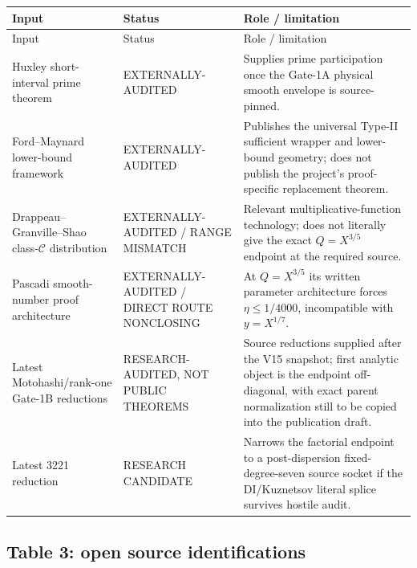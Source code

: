 \documentclass[11pt]{article}
\theoremstyle{definition}
\newcommand{\1}{\mathbf 1}
\newcommand{\status}[1]{\textsf{#1}}
\begin{document}
{\begin{longtable}{p{}p{}p{}}
\toprule
Input & Status & Role / limitation\\
\midrule
\endfirsthead
\toprule
Input & Status & Role / limitation\\
\midrule
Huxley short-interval prime theorem &
\status{EXTERNALLY-AUDITED} &
Supplies prime participation once the Gate-1A physical smooth envelope is source-pinned.\\
Ford--Maynard lower-bound framework &
\status{EXTERNALLY-AUDITED} &
Publishes the universal Type-II sufficient wrapper and lower-bound geometry; does not
publish the project's proof-specific replacement theorem.\\
Drappeau--Granville--Shao class-$\mathcal C$ distribution &
\status{EXTERNALLY-AUDITED / RANGE MISMATCH} &
Relevant multiplicative-function technology; does not literally give the exact
$Q=X^{3/5}$ endpoint at the required source.\\
Pascadi smooth-number proof architecture &
\status{EXTERNALLY-AUDITED / DIRECT ROUTE NONCLOSING} &
At $Q=X^{3/5}$ its written parameter architecture forces $\eta\le1/4000$, incompatible
with $y=X^{1/7}$.\\
Latest Motohashi/rank-one Gate-1B reductions &
\status{RESEARCH-AUDITED, NOT PUBLIC THEOREMS} &
Source reductions supplied after the V15 snapshot; first analytic object is the endpoint
off-diagonal, with exact parent normalization still to be copied into the publication draft.\\
Latest 3221 reduction &
\status{RESEARCH CANDIDATE} &
Narrows the factorial endpoint to a post-dispersion fixed-degree-seven source socket if
the DI/Kuznetsov literal splice survives hostile audit.\\
\bottomrule
\end{longtable}

\subsection{Table 3: open source identifications}

}
\end{document}

